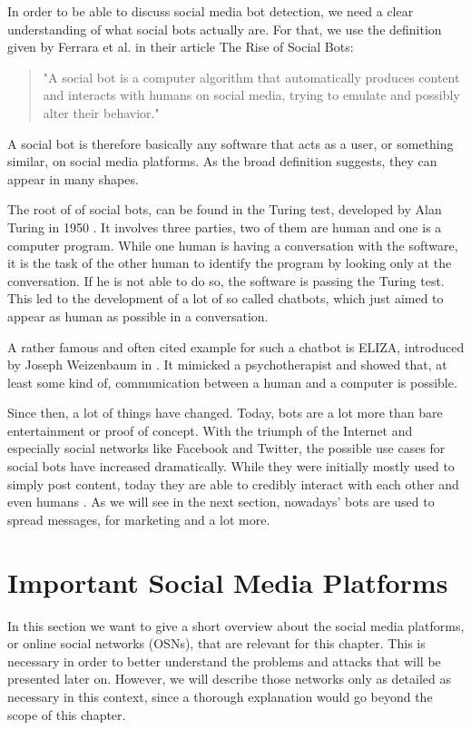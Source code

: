 In order to be able to discuss social media bot detection, we need a clear understanding of what social bots actually are.  For that, we use the definition given by Ferrara et al. in their article The Rise of Social Bots:
\begin{quote}
	"A social bot is a computer algorithm that automatically produces content and interacts with humans on social media, trying to emulate and possibly alter their behavior." \cite{ferrara15}
\end{quote}

A social bot is therefore basically any software that acts as a user, or something similar, on social media platforms. As the broad definition suggests, they can appear in many shapes.

The root of of social bots, can be found in the Turing test, developed by Alan Turing in 1950 \cite{turing}. It involves three parties, two of them are human and one is a computer program. While one human is having a conversation with the software, it is the task of the other human to identify the program by looking only at the conversation. If he is not able to do so, the software is passing the Turing test. This led to the development of a lot of so called chatbots, which just aimed to appear as human as possible in a conversation.  

A rather famous and often cited example for such a chatbot is ELIZA, introduced by Joseph Weizenbaum in \cite{eliza}. It mimicked a psychotherapist and showed that, at least some kind  of, communication between a human and a computer is possible.

Since then, a lot of things have changed. Today, bots are a lot more than bare entertainment or proof of concept. With the triumph of the Internet and especially social networks like Facebook and Twitter, the possible use cases for social bots have increased dramatically. While they were initially mostly used to simply post content, today they are able to credibly interact with each other and even humans \cite{boshmaf13, hwang12}. As we will see in the next section, nowadays' bots are used to spread messages, for marketing and a lot more.

\section{Important Social Media Platforms}

In this section we want to give a short overview about the social media platforms, or online social networks (OSNs), that are relevant for this chapter. This is necessary in order to better understand the problems and attacks that will be presented later on. However, we will describe those networks only as detailed as necessary in this context, since a thorough explanation would go beyond the scope of this chapter.

